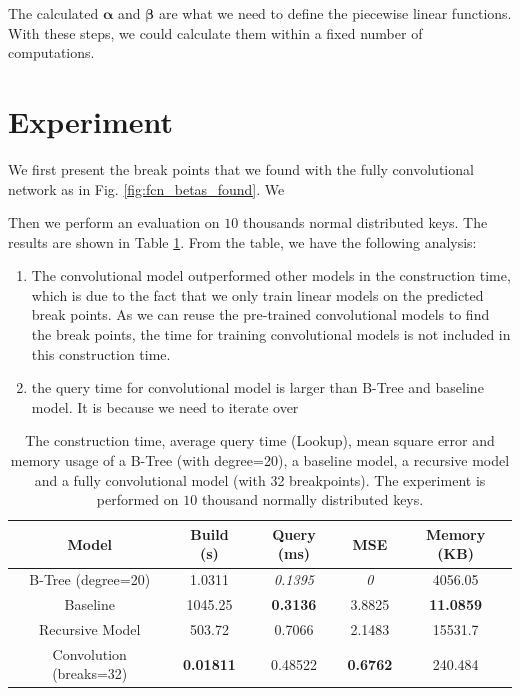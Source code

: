 The calculated $\boldsymbol{\alpha}$ and $\boldsymbol{\beta}$ are what we need to define the piecewise linear functions. With these steps, we could calculate them within a fixed number of computations. 

\section{Experiment}

We first present the break points that we found with the fully convolutional network as in Fig. \ref{fig:fcn_betas_found}. We 


Then we perform an evaluation on $10$ thousands normal distributed keys. The results are shown in Table \ref{fig:conv_table}. From the table, we have the following analysis:

\begin{enumerate}
	\item The convolutional model outperformed other models in the construction time, which is due to the fact that we only train linear models on the predicted break points. As we can reuse the pre-trained convolutional models to find the break points, the time for training convolutional models is not included in this construction time.
	\item the query time for convolutional model is larger than B-Tree and baseline model. It is because we need to iterate over 
\end{enumerate}


\begin{table}[h!]
\centering
\begin{tabular}{ |c|c|c|c|c| }
\hline
Model & Build (s) & Query (ms) & MSE & Memory (KB)\\ 
\hline
B-Tree (degree=20) & 1.0311 & \textit{0.1395} & \textit{0} & 4056.05 \\ 
\hline
Baseline & 1045.25 & \textbf{0.3136} & 3.8825 & \textbf{11.0859} \\
\hline
Recursive Model & 503.72 & 0.7066 & 2.1483 & 15531.7\\ 
\hline
Convolution (breaks=32) & \textbf{0.01811} & 0.48522 & \textbf{0.6762} & 240.484 \\
\hline
\end{tabular}
\caption{The construction time, average query time (Lookup), mean square error and memory usage of a B-Tree (with degree=20), a baseline model, a recursive model and a fully convolutional model (with 32 breakpoints). The experiment is performed on $10$ thousand normally distributed keys.} 
\label{fig:conv_table}
\end{table}

